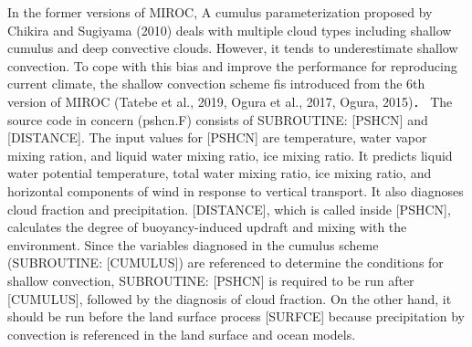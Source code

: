 \documentclass[platex, dvipdfmx]{article}
\begin{document}
In the former versions of MIROC, A cumulus parameterization proposed by Chikira and Sugiyama (2010) deals with multiple cloud types including shallow cumulus and deep convective clouds. However, it tends to underestimate shallow convection.
To cope with this bias and improve the performance for reproducing current climate, the shallow convection scheme fis introduced from the 6th version of MIROC (Tatebe et al., 2019, Ogura et al., 2017, Ogura, 2015)．
The source code in concern (pshcn.F) consists of SUBROUTINE: [PSHCN] and [DISTANCE]. The input values for [PSHCN] are temperature, water vapor mixing ration, and liquid water mixing ratio, ice mixing ratio.
It predicts liquid water potential temperature, total water mixing ratio, ice mixing ratio, and horizontal components of wind in response to vertical transport. It also diagnoses cloud fraction and precipitation.
[DISTANCE], which is called inside [PSHCN], calculates the degree of buoyancy-induced updraft and mixing with the environment.
Since the variables diagnosed in the cumulus scheme (SUBROUTINE: [CUMULUS]) are referenced to determine the conditions for shallow convection, SUBROUTINE: [PSHCN] is required to be run after [CUMULUS], followed by the diagnosis of cloud fraction.
On the other hand, it should be run before the land surface process [SURFCE] because precipitation by convection is referenced in the land surface and ocean models.

\end{document}
